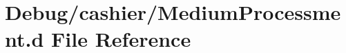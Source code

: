 \hypertarget{MediumProcessment_8d}{\section{Debug/cashier/\-Medium\-Processment.d File Reference}
\label{MediumProcessment_8d}
}
